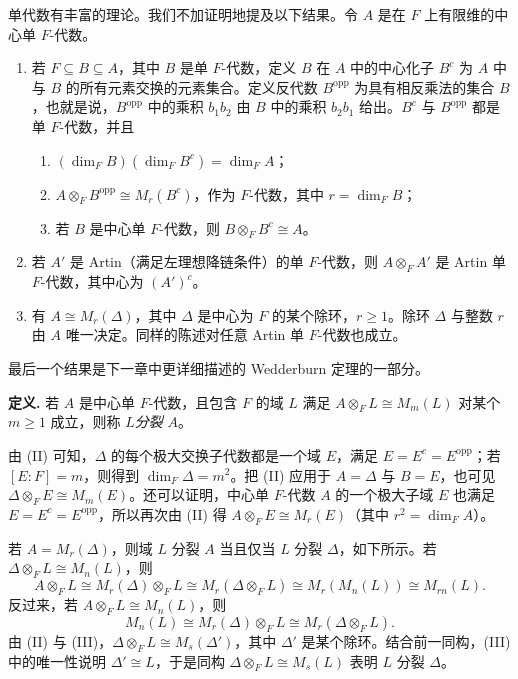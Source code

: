 单代数有丰富的理论。我们不加证明地提及以下结果。令 $A$ 是在 $F$ 上有限维的中心单 $F$-代数。
\begin{enumerate}[label=\Roman*.]
  \item 若 $F\subseteq B\subseteq A$，其中 $B$ 是单 $F$-代数，定义 $B$ 在 $A$ 中的中心化子 $B^c$ 为 $A$ 中与 $B$ 的所有元素交换的元素集合。定义反代数 $B^{\operatorname{opp}}$ 为具有相反乘法的集合 $B$，也就是说，$B^{\operatorname{opp}}$ 中的乘积 $b_1b_2$ 由 $B$ 中的乘积 $b_2b_1$ 给出。$B^c$ 与 $B^{\operatorname{opp}}$ 都是单 $F$-代数，并且
  \begin{enumerate}[label=\alph*.]
    \item $(\dim_F B)(\dim_F B^c)=\dim_F A$；
    \item $A\otimes_F B^{\operatorname{opp}}\cong M_r(B^c)$，作为 $F$-代数，其中 $r=\dim_F B$；
    \item 若 $B$ 是中心单 $F$-代数，则 $B\otimes_F B^c\cong A$。
  \end{enumerate}

  \item 若 $A'$ 是 Artin（满足左理想降链条件）的单 $F$-代数，则 $A\otimes_F A'$ 是 Artin 单 $F$-代数，其中心为 $(A')^c$。

  \item 有 $A\cong M_r(\Delta)$，其中 $\Delta$ 是中心为 $F$ 的某个除环，$r\geq1$。除环 $\Delta$ 与整数 $r$ 由 $A$ 唯一决定。同样的陈述对任意 Artin 单 $F$-代数也成立。
\end{enumerate}
最后一个结果是下一章中更详细描述的 Wedderburn 定理的一部分。

\noindent\textbf{定义.} 若 $A$ 是中心单 $F$-代数，且包含 $F$ 的域 $L$ 满足 $A\otimes_F L\cong M_m(L)$ 对某个 $m\geq1$ 成立，则称 $L$\emph{分裂} $A$。

由 (II) 可知，$\Delta$ 的每个极大交换子代数都是一个域 $E$，满足 $E=E^c=E^{\operatorname{opp}}$；若 $[E:F]=m$，则得到 $\dim_F\Delta=m^2$。把 (II) 应用于 $A=\Delta$ 与 $B=E$，也可见 $\Delta\otimes_F E\cong M_m(E)$。还可以证明，中心单 $F$-代数 $A$ 的一个极大子域 $E$ 也满足 $E=E^c=E^{\operatorname{opp}}$，所以再次由 (II) 得 $A\otimes_F E\cong M_r(E)$（其中 $r^2=\dim_F A$）。

若 $A=M_r(\Delta)$，则域 $L$ 分裂 $A$ 当且仅当 $L$ 分裂 $\Delta$，如下所示。若 $\Delta\otimes_F L\cong M_n(L)$，则
\[
  A\otimes_F L\cong M_r(\Delta)\otimes_F L
  \cong M_r(\Delta\otimes_F L)
  \cong M_r(M_n(L))
  \cong M_{rn}(L).
\]
反过来，若 $A\otimes_F L\cong M_n(L)$，则
\[
  M_n(L)\cong M_r(\Delta)\otimes_F L\cong M_r(\Delta\otimes_F L).
\]
由 (II) 与 (III)，$\Delta\otimes_F L\cong M_s(\Delta')$，其中 $\Delta'$ 是某个除环。结合前一同构，(III) 中的唯一性说明 $\Delta'\cong L$，于是同构 $\Delta\otimes_F L\cong M_s(L)$ 表明 $L$ 分裂 $\Delta$。

